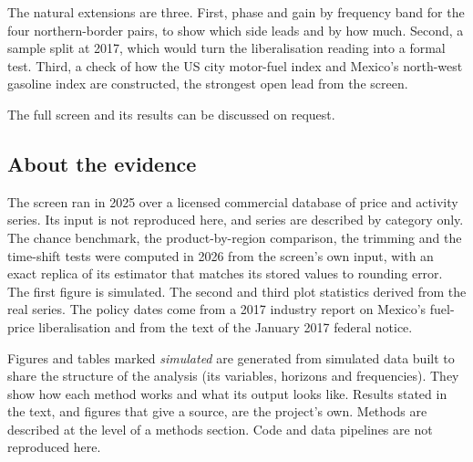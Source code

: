 \documentclass[
  british,
  a4paper,
]{article}
\begin{document}
The natural extensions are three. First, phase and gain by frequency
band for the four northern-border pairs, to show which side leads and by
how much. Second, a sample split at 2017, which would turn the
liberalisation reading into a formal test. Third, a check of how the US
city motor-fuel index and Mexico's north-west gasoline index are
constructed, the strongest open lead from the screen.

The full screen and its results can be discussed on request.

\subsection{About the evidence}\label{about-the-evidence}

The screen ran in 2025 over a licensed commercial database of price and
activity series. Its input is not reproduced here, and series are
described by category only. The chance benchmark, the product-by-region
comparison, the trimming and the time-shift tests were computed in 2026
from the screen's own input, with an exact replica of its estimator that
matches its stored values to rounding error. The first figure is
simulated. The second and third plot statistics derived from the real
series. The policy dates come from a 2017 industry report on Mexico's
fuel-price liberalisation and from the text of the January 2017 federal
notice.

Figures and tables marked \emph{simulated} are generated from simulated
data built to share the structure of the analysis (its variables,
horizons and frequencies). They show how each method works and what its
output looks like. Results stated in the text, and figures that give a
source, are the project's own. Methods are described at the level of a
methods section. Code and data pipelines are not reproduced here.
\end{document}

